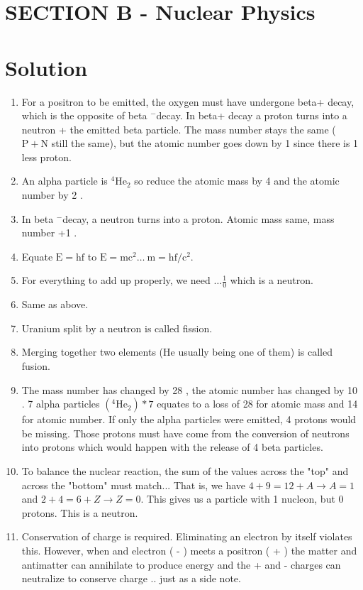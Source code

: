 \begin{enumerate}
\section*{SECTION B - Nuclear Physics}
\section*{Solution}
\begin{enumerate}
  \item For a positron to be emitted, the oxygen must have undergone beta+ decay, which is the opposite of beta $^{-}$decay. In beta+ decay a proton turns into a neutron + the emitted beta particle. The mass number stays the same ( $\mathrm{P}+\mathrm{N}$ still the same), but the atomic number goes down by 1 since there is 1 less proton.
  \item An alpha particle is ${ }^{4} \mathrm{He}_{2}$ so reduce the atomic mass by 4 and the atomic number by 2 .
  \item In beta ${ }^{-}$decay, a neutron turns into a proton. Atomic mass same, mass number +1 .
  \item Equate $\mathrm{E}=\mathrm{hf}$ to $\mathrm{E}=\mathrm{mc}^{2} \ldots \mathrm{~m}=\mathrm{hf} / \mathrm{c}^{2}$.
  \item For everything to add up properly, we need $\ldots \frac{1}{0}$ which is a neutron.
  \item Same as above.
  \item Uranium split by a neutron is called fission.
  \item Merging together two elements (He usually being one of them) is called fusion.
  \item The mass number has changed by 28 , the atomic number has changed by 10 . 7 alpha particles $\left({ }^{4} \mathrm{He}_{2}\right) * 7$ equates to a loss of 28 for atomic mass and 14 for atomic number. If only the alpha particles were emitted, 4 protons would be missing. Those protons must have come from the conversion of neutrons into protons which would happen with the release of 4 beta particles.
  \item To balance the nuclear reaction, the sum of the values across the "top" and across the "bottom" must match... That is, we have $4+9=12+A \rightarrow A=1$ and $2+4=6+Z \rightarrow Z=0$. This gives us a particle with 1 nucleon, but 0 protons. This is a neutron.
  \item Conservation of charge is required. Eliminating an electron by itself violates this. However, when and electron ( - ) meets a positron ( + ) the matter and antimatter can annihilate to produce energy and the + and - charges can neutralize to conserve charge .. just as a side note.

\end{enumerate}
\end{enumerate}
